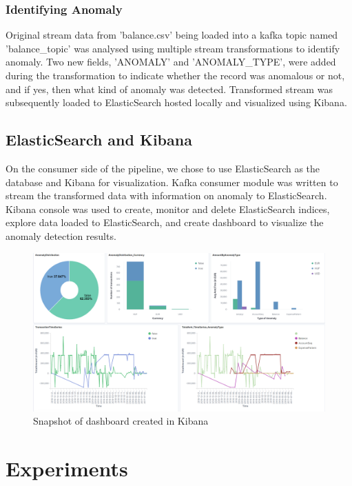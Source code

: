 \documentclass{article}
\begin{document}
\subsubsection{Identifying Anomaly}

Original stream data from 'balance.csv' being loaded into a kafka topic named 'balance\_topic' was analysed using multiple stream transformations to identify anomaly. Two new fields, 'ANOMALY' and 'ANOMALY\_TYPE', were added during the transformation to indicate whether the record was anomalous or not, and if yes, then what kind of anomaly was detected. Transformed stream was subsequently loaded to ElasticSearch hosted locally and visualized using Kibana.

\subsection{ElasticSearch and Kibana}

On the consumer side of the pipeline, we chose to use ElasticSearch as the database and Kibana for visualization. Kafka consumer module was written to stream the transformed data with information on anomaly to ElasticSearch. Kibana console was used to create, monitor and delete ElasticSearch indices, explore data loaded to ElasticSearch, and create dashboard to visualize the anomaly detection results.

\begin{figure}[h!]
\centering
\includegraphics[width=\textwidth]{Dashboard_snapshot.PNG}
\caption{Snapshot of dashboard created in Kibana}
\label{fig:OuptutDashboard}
\end{figure}


\section{Experiments}
\end{document}
